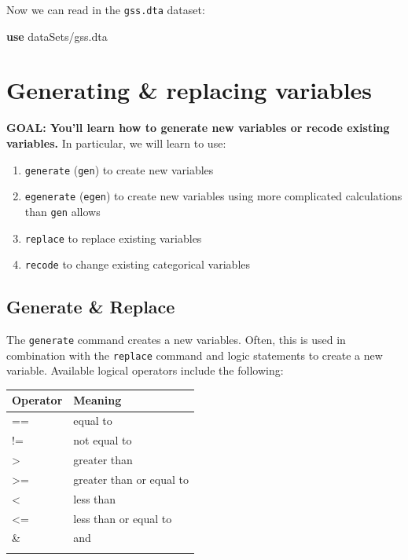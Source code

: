 \documentclass[
]{book}
\newenvironment{Shaded}{\begin{snugshade}}{\end{snugshade}}
\newcommand{\KeywordTok}[1]{\textcolor[rgb]{0.13,0.29,0.53}{\textbf{#1}}}
\newcommand{\NormalTok}[1]{#1}
\providecommand{\tightlist}{%
  \setlength{\itemsep}{0pt}\setlength{\parskip}{0pt}}
\begin{document}
Now we can read in the \texttt{gss.dta} dataset:

\begin{Shaded}
\begin{Highlighting}[]
\KeywordTok{use}\NormalTok{ dataSets/gss.dta}
\end{Highlighting}
\end{Shaded}

\hypertarget{generating-replacing-variables-1}{%
\section{Generating \& replacing variables}\label{generating-replacing-variables-1}}

\begin{alert}

\textbf{GOAL: You'll learn how to generate new variables or recode existing variables.} In particular, we will learn to use:

\begin{enumerate}
\def\labelenumi{\arabic{enumi}.}
\tightlist
\item
  \texttt{generate} (\texttt{gen}) to create new variables
\item
  \texttt{egenerate} (\texttt{egen}) to create new variables using more complicated calculations than \texttt{gen} allows
\item
  \texttt{replace} to replace existing variables
\item
  \texttt{recode} to change existing categorical variables
\end{enumerate}

\end{alert}

\hypertarget{generate-replace}{%
\subsection{Generate \& Replace}\label{generate-replace}}

The \texttt{generate} command creates a new variables. Often, this is used in combination with the \texttt{replace} command and logic statements to create a new variable. Available logical operators include the following:

\begin{longtable}[]{@{}ll@{}}
\toprule
Operator & Meaning\tabularnewline
\midrule
\endhead
== & equal to\tabularnewline
!= & not equal to\tabularnewline
\textgreater{} & greater than\tabularnewline
\textgreater= & greater than or equal to\tabularnewline
\textless{} & less than\tabularnewline
\textless= & less than or equal to\tabularnewline
\& & and\tabularnewline
&\tabularnewline
\bottomrule
\end{longtable}
\end{document}

